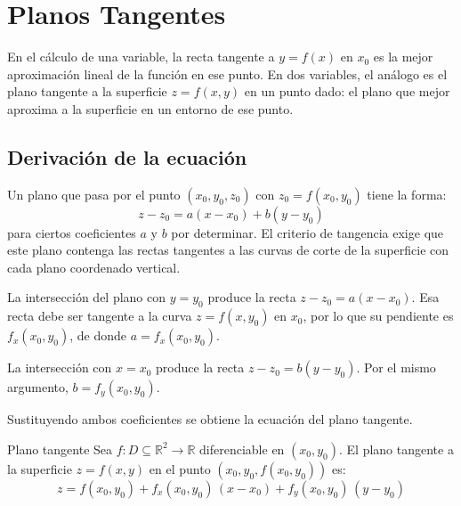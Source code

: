 \section{Planos Tangentes}

En el cálculo de una variable, la recta tangente a $y = f(x)$ en $x_0$ es la mejor aproximación lineal de la función en ese punto. En dos variables, el análogo es el plano tangente a la superficie $z = f(x, y)$ en un punto dado: el plano que mejor aproxima a la superficie en un entorno de ese punto.

\subsection{Derivación de la ecuación}

Un plano que pasa por el punto $(x_0, y_0, z_0)$ con $z_0 = f(x_0, y_0)$ tiene la forma:
\[
z - z_0 = a(x - x_0) + b(y - y_0)
\]
para ciertos coeficientes $a$ y $b$ por determinar. El criterio de tangencia exige que este plano contenga las rectas tangentes a las curvas de corte de la superficie con cada plano coordenado vertical.

La intersección del plano con $y = y_0$ produce la recta $z - z_0 = a(x - x_0)$. Esa recta debe ser tangente a la curva $z = f(x, y_0)$ en $x_0$, por lo que su pendiente es $f_x(x_0, y_0)$, de donde $a = f_x(x_0, y_0)$.

La intersección con $x = x_0$ produce la recta $z - z_0 = b(y - y_0)$. Por el mismo argumento, $b = f_y(x_0, y_0)$.

Sustituyendo ambos coeficientes se obtiene la ecuación del plano tangente.

\begin{mydefinition}{Plano tangente}
Sea $f: D \subseteq \mathbb{R}^2 \to \mathbb{R}$ diferenciable en $(x_0, y_0)$. El plano tangente a la superficie $z = f(x, y)$ en el punto $(x_0, y_0, f(x_0, y_0))$ es:
\[
z = f(x_0, y_0) + f_x(x_0, y_0)\,(x - x_0) + f_y(x_0, y_0)\,(y - y_0)
\]
\end{mydefinition}

